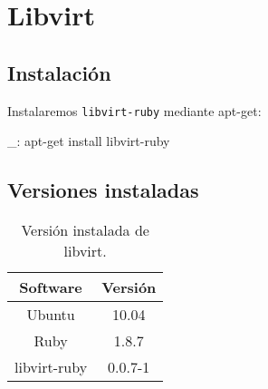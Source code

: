 \chapter{Libvirt}
\label{anx:libvirt}

\section{Instalación}

Instalaremos \texttt{libvirt-ruby} mediante apt-get:

\begin{bashcode}
_: apt-get install libvirt-ruby
\end{bashcode}


\section{Versiones instaladas}

\begin{table}[!htbp]
\centering
   \begin{tabular}{|c|c|}
      \hline
      \textbf{Software} & \textbf{Versión} \\ \hline
      Ubuntu & 10.04 \\ \hline
      Ruby & 1.8.7 \\ \hline
      libvirt-ruby & 0.0.7-1 \\ \hline
   \end{tabular}
\caption{Versión instalada de libvirt.}
\label{table:libvirt-versions}
\end{table}
